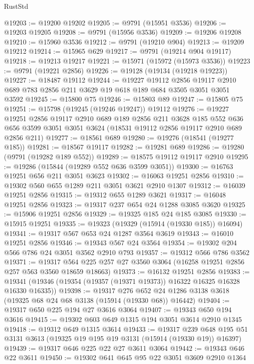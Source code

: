 \begin{lexlean}{RustStd}
\begin{coremodule}
@19203 := @19200 @19202
@19205 := @9791 (@15951 @3536)
@19206 := @19203 @19205
@19208 := @9791 (@15956 @3536)
@19209 := @19206 @19208
@19210 := @15960 @3536
@19212 := @9791 (@19210 @904)
@19213 := @19209 @19212
@19214 := @15965 @629
@19217 := @9791 (@19214 @904 @19117)
@19218 := @19213 @19217
@19221 := @15971 (@15972 (@15973 @3536))
@19223 := @9791 (@19221 @2856)
@19226 := @19128 (@19134 (@19218 @19223))
@19227 := @18487 @19112
@19244 := @19227
    @19112
    @2856
    @19117
    @2910
    @689
    @783
    @2856
    @211
    @3629
    @19
    @618
    @189
    @684
    @3505
    @3051
    @3051
    @3592
@19245 := @15800 @75
@19246 := @15803 @89
@19247 := @15805 @75
@19251 := @15798 (@19245 (@19246 @19247)) @19112
@19276 := @19227
    @19251
    @2856
    @19117
    @2910
    @689
    @189
    @2856
    @211
    @3628
    @185
    @552
    @636
    @656
    @3599
    @3051
    @3051
    @3624
    (@18531 @19112 @2856 @19117 @2910 @689 @2856 @211)
@19277 := @18561 @689
@19280 := @19276 (@18541 (@19277 @185))
@19281 := @18567 @19117
@19282 := @19281 @689
@19286 := @19280 (@9791 (@19282 @189 @552))
@19289 := @18575 @19112 @19117 @2910
@19295 := @19286 (@15844 (@19289 @552 @636 @3599 @3051))
@19300 := @16763 @19251 @656 @211 @3051 @3623
@19302 := @16063 @19251 @2856
@19310 := @19302 @560 @655 @1289 @211 @3051 @3621 @2910 @1307
@19312 := @16039 @19251 @2856
@19315 := @19312 @655 @1289 @3621
@19317 := @16048 @19251 @2856
@19323 := @19317 @237 @654 @24 @1288 @3085 @3620
@19325 := @15906 @19251 @2856
@19329 := @19325 @185 @24 @185 @3085
@19330 := @15915 @19251
@19335 := @19323 (@19329 (@15914 (@19330 @185)) @16094)
@19341 := @19317 @567 @653 @24 @1287 @3564 @3619
@19343 := @16010 @19251 @2856
@19346 := @19343 @567 @24 @3564
@19354 := @19302 @204 @566 @786 @24 @3051 @3562 @2910 @793
@19357 := @19312 @566 @786 @3562
@19371 := @19317 @564 @225 @257 @27 @3560 @3064 (@16258 @19251 @2856 @257 @563 @3560 @18659 @18663)
@19373 := @16132 @19251 @2856
@19383 := @19341 (@19346 (@19354 (@19357 (@19371 @19373)) @16322 @16325 @16328 @16330 @16335))
@19398 := @19317
    @276
    @652
    @24
    @1286
    @3138
    @3618
    (@19325 @68 @24 @68 @3138 (@15914 (@19330 @68)) @16442)
@19404 := @19317 @650 @225 @194 @27 @3616 @3064
@19407 := @19343 @650 @194 @3616
@19415 := @19302 @603 @649 @1315 @194 @3051 @3614 @2910 @1345
@19418 := @19312 @649 @1315 @3614
@19433 := @19317
    @239
    @648
    @195
    @51
    @3131
    @3613
    (@19325 @19 @195 @19 @3131 (@15914 (@19330 @19)) @16397)
@19439 := @19317 @646 @225 @22 @27 @3611 @3064
@19442 := @19343 @646 @22 @3611
@19450 := @19302 @641 @645 @95 @22 @3051 @3609 @2910 @1364

\end{coremodule}
\end{lexlean}
